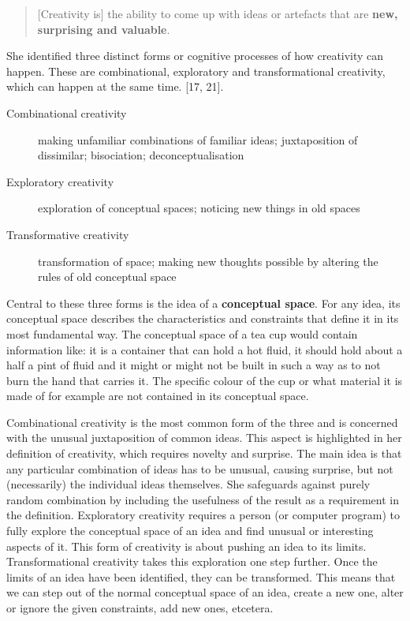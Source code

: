 \begin{quotation}
  [Creativity is] the ability to come up with ideas or artefacts that are \textbf{new, surprising and valuable}. 
\end{quotation}

She identified three distinct forms or cognitive processes of how creativity can happen. These are combinational, exploratory and transformational creativity, which can happen at the same time. \autocite{Boden2003}[17, 21].

\begin{description}
  \item [Combinational creativity] making unfamiliar combinations of familiar ideas; juxtaposition of dissimilar; bisociation; deconceptualisation
  \item [Exploratory creativity] exploration of conceptual spaces; noticing new things in old spaces
  \item [Transformative creativity] transformation of space; making new thoughts possible by altering the rules of old conceptual space
\end{description}

Central to these three forms is the idea of a \textbf{conceptual space}. For any idea, its conceptual space describes the characteristics and constraints that define it in its most fundamental way. The conceptual space of a tea cup would contain information like: it is a container that can hold a hot fluid, it should hold about a half a pint of fluid and it might or might not be built in such a way as to not burn the hand that carries it. The specific colour of the cup or what material it is made of for example are not contained in its conceptual space.

Combinational creativity is the most common form of the three and is concerned with the unusual juxtaposition of common ideas. This aspect is highlighted in her definition of creativity, which requires novelty and surprise. The main idea is that any particular combination of ideas has to be unusual, causing surprise, but not (necessarily) the individual ideas themselves. She safeguards against purely random combination by including the usefulness of the result as a requirement in the definition. Exploratory creativity requires a person (or computer program) to fully explore the conceptual space of an idea and find unusual or interesting aspects of it. This form of creativity is about pushing an idea to its limits. Transformational creativity takes this exploration one step further. Once the limits of an idea have been identified, they can be transformed. This means that we can step out of the normal conceptual space of an idea, create a new one, alter or ignore the given constraints, add new ones, etcetera.

